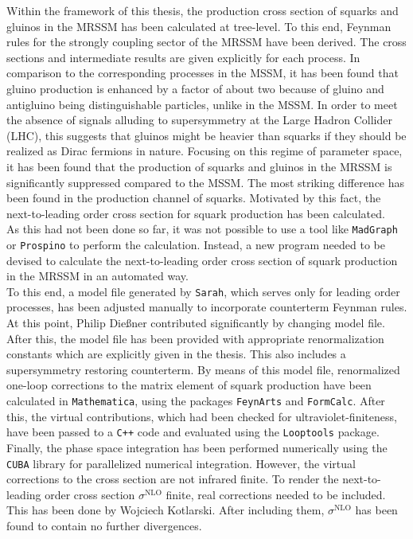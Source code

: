 Within the framework of this thesis, the production cross section of squarks and gluinos in the MRSSM has been calculated at tree-level. To this end, Feynman rules for the strongly coupling sector of the MRSSM have been derived. The cross sections and intermediate results are given explicitly for each process. In comparison to the corresponding processes in the MSSM, it has been found that gluino production is enhanced by a factor of about two because of gluino and antigluino being distinguishable particles, unlike in the MSSM. In order to meet the absence of signals alluding to supersymmetry at the Large Hadron Collider (LHC), this suggests that gluinos might be heavier than squarks if they should be realized as Dirac fermions in nature. Focusing on this regime of parameter space, it has been found that the production of squarks and gluinos in the MRSSM is significantly suppressed compared to the MSSM. The most striking difference has been found in the production channel of squarks. Motivated by this fact, the next-to-leading order cross section for squark production has been calculated.\\
As this had not been done so far, it was not possible to use a tool like \texttt{MadGraph} or \texttt{Prospino} to perform the calculation. Instead, a new program needed to be devised to calculate the next-to-leading order cross section of squark production in the MRSSM in an automated way.\\
To this end, a model file generated by \texttt{Sarah}, which serves only for leading order processes, has been adjusted manually to incorporate counterterm Feynman rules. At this point, Philip Dießner contributed significantly by changing model file. After this, the model file has been provided with appropriate renormalization constants which are explicitly given in the thesis. This also includes  a supersymmetry restoring counterterm. By means of this model file, renormalized one-loop corrections to the matrix element of squark production have been calculated in \texttt{Mathematica}, using the packages \texttt{FeynArts} and \texttt{FormCalc}. After this, the virtual contributions, which had been checked for ultraviolet-finiteness, have been passed to a \texttt{C++} code and evaluated using the \texttt{Looptools} package. Finally, the phase space integration has been performed numerically using the \texttt{CUBA} library for parallelized numerical integration. However, the virtual corrections to the cross section are not infrared finite. To render the next-to-leading order cross section $\sigma^{\mathrm{NLO}}$ finite, real corrections needed to be included. This has been done by Wojciech Kotlarski. After including them, $\sigma^{\mathrm{NLO}}$ has been found to contain no further divergences.\\
